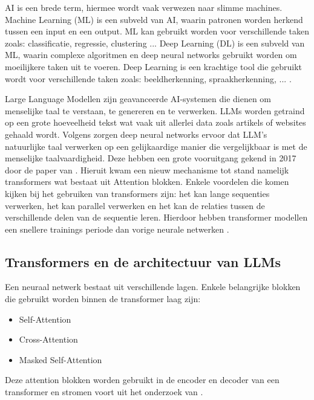 AI is een brede term, hiermee wordt vaak verwezen naar slimme machines. 
Machine Learning (ML) is een subveld van AI, waarin patronen worden herkend tussen een input en een output.
ML kan gebruikt worden voor verschillende taken zoals: classificatie, regressie, clustering ...
Deep Learning (DL) is een subveld van ML, waarin complexe algoritmen en deep neural networks gebruikt worden om moeilijkere taken uit te voeren.
Deep Learning is een krachtige tool die gebruikt wordt voor verschillende taken zoals: beeldherkenning, spraakherkenning, ... \autocite{Stoeffelbauer2023}.

Large Language Modellen zijn geavanceerde AI-systemen die dienen om menselijke taal te verstaan, te genereren en te verwerken.
LLMs worden getraind op een grote hoeveelheid tekst wat vaak uit allerlei data zoals artikels of websites gehaald wordt. 
Volgens \textcite{Beelen2023} zorgen deep neural networks ervoor dat LLM's natuurlijke taal verwerken op een gelijkaardige manier die vergelijkbaar is met de menselijke taalvaardigheid.
Deze hebben een grote vooruitgang gekend in 2017 door de paper van \textcite{VaswaniEtAl2017}. 
Hieruit kwam een nieuw mechanisme tot stand namelijk transformers wat bestaat uit Attention blokken. 
Enkele voordelen die komen kijken bij het gebruiken van transformers zijn: het kan lange sequenties verwerken, het kan parallel verwerken en het kan de relaties tussen de verschillende delen van de sequentie leren.
Hierdoor hebben transformer modellen een snellere trainings periode dan vorige neurale netwerken \autocite{aiml2023}.

\subsection{Transformers en de architectuur van LLMs}
\label{sec:architectuur-van-llms}
Een neuraal netwerk bestaat uit verschillende lagen. Enkele belangrijke blokken die gebruikt worden binnen de transformer laag zijn:
\begin{itemize}
  \item Self-Attention
  \item Cross-Attention
  \item Masked Self-Attention
\end{itemize}

Deze attention blokken worden gebruikt in de encoder en decoder van een transformer en stromen voort uit het onderzoek van \textcite{VaswaniEtAl2017}.

